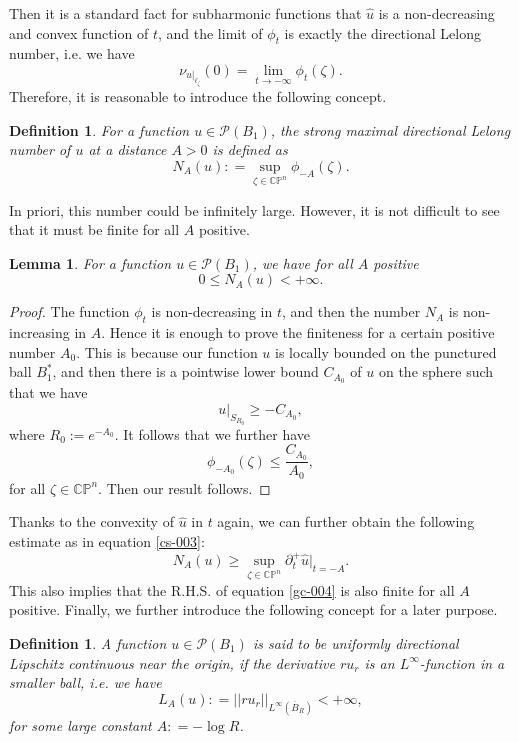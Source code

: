 \documentclass[a4paper,11pt]{amsart}
\numberwithin{equation}{section}
\newtheorem{defn}[theorem]{Definition}
\newtheorem{lemma}[theorem]{Lemma}
\def\d{\partial}
\def\cP{{\mathcal P}}
\def\cP{{\mathcal P}}
\def\bC{{\mathbb C}}
\def\bP{{\mathbb P}}
\def\z{{\zeta}}
\def\l{{\ell}}
\begin{document}
Then it is a standard fact for subharmonic functions 
that $\hat u$ is a non-decreasing and convex function of $t$, 
and the limit of $\phi_t$ is exactly the directional Lelong number, i.e. we have 
\begin{equation}
\label{gc-002}
\nu_{u|_{\l_\z}}(0) = \lim_{t\rightarrow -\infty} \phi_t(\z).
\end{equation} 
Therefore, it is reasonable to introduce the following concept. 


\begin{defn}
\label{def-pre-004}
For a function $u\in \cP(B_1)$, 
the strong maximal directional Lelong number of $u$
at a distance $A>0$ is defined as 
$$ N_A(u): =  \sup_{\z\in \bC\bP^n} \phi_{-A} (\z).$$
\end{defn}
In priori, this number could be infinitely large. 
However, it is not difficult to see that it must be finite for all $A$ positive. 

\begin{lemma}
\label{lem-gc-001}
For a function $u\in \cP(B_1)$, we have for all $A$ positive
$$ 0\leq N_A(u)<  +\infty.  $$
\end{lemma}
\begin{proof}
The function $\phi_t$ is non-decreasing in $t$, 
and then the number $N_A$ is non-increasing in $A$. 
Hence
it is enough to prove the finiteness 
for a certain positive number $A_0$. 
This is because our function $u$ is locally bounded 
on the punctured ball $B^*_1$, 
and then there is a pointwise lower bound $C_{A_0}$ of $u$ on the sphere  
such that we have 
$$ u|_{S_{R_0}} \geq -C_{A_0}, $$
where $R_0:= e^{-A_0}$.
It follows that we further have 
\begin{equation}
\label{gc-003}
 \phi_{-A_0}(\z) \leq  \frac{ C_{A_0} }{ A_0},
\end{equation} 
for all $\z\in \bC\bP^n$. Then our result follows. 

\end{proof}

Thanks to the convexity of $\hat u$ in $t$ again, 
we can further obtain the following estimate as in equation \eqref{cs-003}: 
\begin{equation}
\label{gc-004}
N_A (u) \geq \sup_{\z\in \bC\bP^n}  \d^+_t \hat u|_{t= -A}.
\end{equation} 
This also implies that the R.H.S. of equation \eqref{gc-004}
is also finite for all $A$ positive. 
Finally, 
we further introduce the following concept
for a later purpose.  


\begin{defn}
\label{def-pre-003}
A function $u\in \cP(B_1)$ is said to be uniformly directional Lipschitz continuous near the origin,
if the derivative $ ru_r$ is an $L^{\infty}$-function in a smaller ball, i.e. 
we have 
$$ L_A(u): = || ru_r ||_{L^{\infty}(\overline{B}_R)} < +\infty, $$
for some large constant $A: = -\log R$. 
\end{defn}
\end{document}
